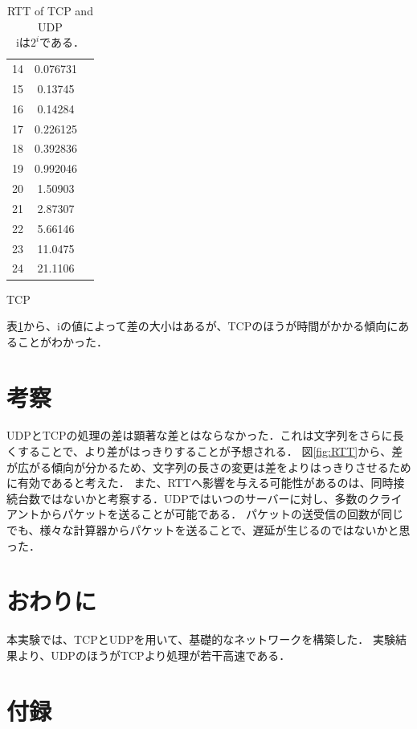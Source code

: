 \documentclass[fleqn, a4paper. 12pt]{ltjsarticle}
\begin{document}
\begin{table}[htbp]
\begin{subtable}[b]{0.4\textwidth}
\begin{tabular}{|c|c|c|}
              14 & 0.076731 &  \\ \cline{1-2}
              15 & 0.13745  &  \\ \cline{1-2}
              16 & 0.14284  &  \\ \cline{1-2}
              17 & 0.226125 &  \\ \cline{1-2}
              18 & 0.392836 &  \\ \cline{1-2}
              19 & 0.992046 &  \\ \cline{1-2}
              20 & 1.50903  &  \\ \cline{1-2}
              21 & 2.87307  &  \\ \cline{1-2}
              22 & 5.66146  &  \\ \cline{1-2}
              23 & 11.0475  &  \\ \cline{1-2}
              24 & 21.1106  &  \\ \cline{1-2}
            \end{tabular}
            \caption{TCP}
            \label{tab:table2}
        \end{subtable}
        \caption{RTT of TCP and UDP\\iは$2^{i}$である．}
        \label{tab:tables}
    \end{table}
    表\ref{tab:tables}から、iの値によって差の大小はあるが、TCPのほうが時間がかかる傾向にあることがわかった．

    \section{考察}
    UDPとTCPの処理の差は顕著な差とはならなかった．これは文字列をさらに長くすることで、より差がはっきりすることが予想される．
    図\ref{fig:RTT}から、差が広がる傾向が分かるため、文字列の長さの変更は差をよりはっきりさせるために有効であると考えた．
    また、RTTへ影響を与える可能性があるのは、同時接続台数ではないかと考察する．UDPではいつのサーバーに対し、多数のクライアントからパケットを送ることが可能である．
    パケットの送受信の回数が同じでも、様々な計算器からパケットを送ることで、遅延が生じるのではないかと思った．


    \section{おわりに}
    本実験では、TCPとUDPを用いて、基礎的なネットワークを構築した．
    実験結果より、UDPのほうがTCPより処理が若干高速である．

    \appendix
\section{付録}
\end{document}
